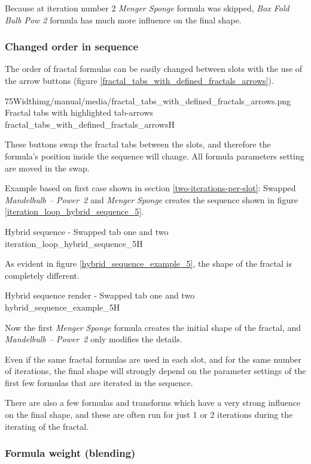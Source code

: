 Because at iteration number 2 \emph{Menger Sponge} formula was skipped, \emph{Box Fold Bulb Pow 2} formula has much more influence on the final shape.

\subsubsection{Changed order in sequence}

The order of fractal formulas can be easily changed between slots with the use of the arrow buttons (figure \ref{fractal_tabs_with_defined_fractals_arrows}).

\simpleImageWithCaption75Width{img/manual/media/fractal_tabs_with_defined_fractals_arrows.png}
{Fractal tabs with highlighted tab-arrows}
{fractal_tabs_with_defined_fractals_arrows}{H}

These buttons swap the fractal tabs between the slots, and therefore the formula's position inside the sequence will change. All formula parameters setting are moved in the swap.

Example based on first case shown in section \ref{two-iterations-per-slot}:
Swapped \emph{Mandelbulb -- Power~2} and \emph{Menger Sponge} creates the sequence shown in figure \ref{iteration_loop_hybrid_sequence_5}.

{Hybrid sequence - Swapped tab one and two}
{iteration_loop_hybrid_sequence_5}{H}

As evident in figure \ref{hybrid_sequence_example_5}, the shape of the fractal is completely different.

{Hybrid sequence render - Swapped tab one and two}
{hybrid_sequence_example_5}{H}

Now the first \emph{Menger Sponge} formula creates the initial shape of the fractal, and \emph{Mandelbulb -- Power~2} only modifies the details.

Even if the same fractal formulas are used in each slot, and for the same number of iterations, the final shape will strongly depend on the parameter settings of the first few formulas that are iterated in the sequence.

There are also a few formulas and transforms which have a very strong influence on the final shape, and these are often run for just 1 or 2 iterations during the iterating of the fractal.

\subsubsection{Formula weight (blending)}

